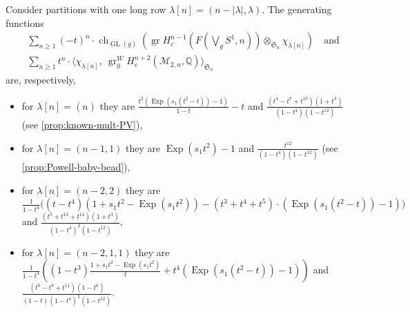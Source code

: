 \documentclass[12pt]{article}
\newcommand{\Q}{\mathbb{Q}}
\newcommand{\SymGroup}[1][n]{\mathfrak{S}_{#1}}
\newcommand{\Specht}[1]{\chi_{#1}}
\newcommand{\ModuliCurve}[1]{\mathcal{M}_{#1}}
\DeclareMathOperator{\GL}{GL}
\DeclareMathOperator{\gr}{gr}
\theoremstyle{plain}
\theoremstyle{definition}
\theoremstyle{remark}
\begin{document}
Consider partitions with one long row $\lambda[n] = (n-|\lambda|,\lambda)$. The generating functions
\begin{align*}
    &\sum_{n\geq 1}{(-t)^n \cdot \operatorname{ch}_{\GL(g)}\left(\gr H_c^{n-1}(F(\bigvee_g S^1, n))\otimes_{\SymGroup}\Specht{\lambda[n]}\right)}\quad\text{and}\\
    &\sum_{n\geq 1}{t^n\cdot\langle\Specht{\lambda[n]},\ \gr_0^W H_c^{n+2}(\ModuliCurve{2,n},\Q)\rangle_{\SymGroup}}
\end{align*}
are, respectively,
\begin{itemize}
    \item for $\lambda[n] = (n)$ they are $\frac{t^2(\operatorname{Exp}(s_1(t^2-t))-1)}{1-t} - t$ and $\frac{(t^4-t^7 + t^{10})(1+t^3)}{(1-t^4)(1-t^{12})}$  (see \ref{prop:known-mult-PV}),
    \item for $\lambda[n] = (n-1,1)$ they are $\operatorname{Exp}(s_1 t^2)-1$ and $\frac{t^{12}}{(1-t^4)(1-t^{12})}$ (see \ref{prop:Powell-baby-bead}),
    \item for $\lambda[n] = (n-2,2)$ they are $\frac{1}{1-t^4}\Big((t-t^4)(1+s_1t^2-\operatorname{Exp}(s_1t^2))-(t^3+t^4+t^5)\cdot({\operatorname{Exp}(s_1(t^2-t))}-1)\Big)$ and $\frac{(t^5 + t^{13} + t^{14})(1+t^3)}{(1-t^4)^2(1-t^{12})}$,
    \item for $\lambda[n] = (n-2,1,1)$ they are $\frac{1}{1-t^4}\left((1-t^3)\frac{1+s_1t^2-\operatorname{Exp}(s_1t^2)}{t}+t^4(\operatorname{Exp}(s_1(t^2-t))-1)\right)$ and $\frac{(t^6-t^8+t^{11})(1-t^6)}{(1-t)(1-t^4)^2(1-t^{12})}$.
\end{itemize}
\end{document}
